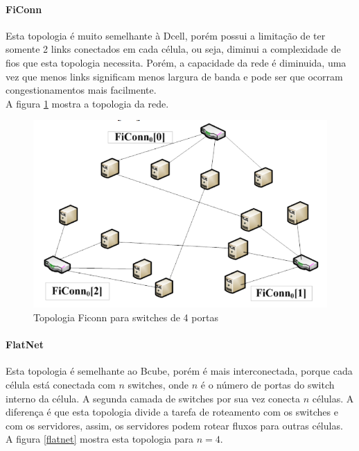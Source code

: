 \documentclass[12pt,a4paper]{report}
\begin{document}
\paragraph{FiConn}
Esta topologia é muito semelhante à Dcell, porém possui a limitação de ter somente 2 links conectados em cada célula, ou seja, diminui a complexidade de fios que esta topologia necessita. Porém, a capacidade da rede é diminuida, uma vez que menos links significam menos largura de banda e pode ser que ocorram congestionamentos mais facilmente.\\

A figura \ref{ficonn} mostra a topologia da rede.\\

\begin{figure}[H]
\centering
\includegraphics[width=.8\textwidth]{imagens/ficonn.png}
\caption{Topologia Ficonn para switches de 4 portas}
\label{ficonn}
\end{figure}

\paragraph{FlatNet}
Esta topologia é semelhante ao Bcube, porém é mais interconectada, porque cada célula está conectada com $n$ switches, onde $n$ é o número de portas do switch interno da célula. A segunda camada de switches por sua vez conecta $n$ células. A diferença é que esta topologia divide a tarefa de roteamento com os switches e com os servidores, assim, os servidores podem rotear fluxos para outras células.\\

A figura \ref{flatnet} mostra esta topologia para $n=4$.\\
\end{document}
